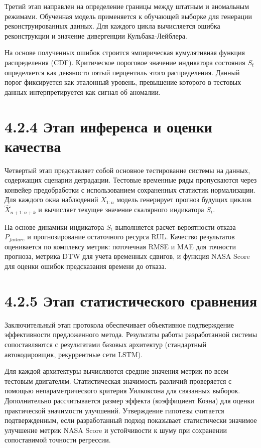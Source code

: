 \documentclass[14pt, a4paper, oneside]{extreport}
\begin{document}
Третий этап направлен на определение границы между штатным и аномальным режимами. Обученная модель применяется к обучающей выборке для генерации реконструированных данных. Для каждого цикла вычисляется ошибка реконструкции и значение дивергенции Кульбака-Лейблера.

На основе полученных ошибок строится эмпирическая кумулятивная функция распределения (CDF). Критическое пороговое значение индикатора состояния $S_t$ определяется как девяносто пятый перцентиль этого распределения. Данный порог фиксируется как эталонный уровень, превышение которого в тестовых данных интерпретируется как сигнал об аномалии.

\vspace{1em}
\section{4.2.4 Этап инференса и оценки качества}
\vspace{1em}

Четвертый этап представляет собой основное тестирование системы на данных, содержащих сценарии деградации. Тестовые временные ряды пропускаются через конвейер предобработки с использованием сохраненных статистик нормализации. Для каждого окна наблюдений $X_{1:n}$ модель генерирует прогноз будущих циклов $\hat{X}_{n+1:n+k}$ и вычисляет текущее значение скалярного индикатора $S_t$.

На основе динамики индикатора $S_t$ выполняется расчет вероятности отказа $P_{failure}$ и прогнозирование остаточного ресурса RUL. Качество результатов оценивается по комплексу метрик: поточечная RMSE и MAE для точности прогноза, метрика DTW для учета временных сдвигов, и функция NASA Score для оценки ошибок предсказания времени до отказа.

\vspace{1em}
\section{4.2.5 Этап статистического сравнения}
\vspace{1em}

Заключительный этап протокола обеспечивает объективное подтверждение эффективности предложенного метода. Результаты работы разработанной системы сопоставляются с результатами базовых архитектур (стандартный автокодировщик, рекуррентные сети LSTM).

Для каждой архитектуры вычисляются средние значения метрик по всем тестовым двигателям. Статистическая значимость различий проверяется с помощью непараметрического критерия Уилкоксона для связанных выборок. Дополнительно рассчитывается размер эффекта (коэффициент Коэна) для оценки практической значимости улучшений. Утверждение гипотезы считается подтвержденным, если разработанный подход показывает статистически значимое улучшение метрик NASA Score и устойчивости к шуму при сохранении сопоставимой точности регрессии.
\end{document}

